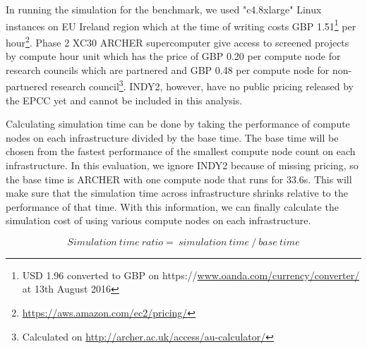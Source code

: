 In running the simulation for the benchmark, we used "c4.8xlarge" Linux instances on EU Ireland region which at the time of writing costs GBP 1.51\footnote{USD 1.96 converted to GBP on https://\url{www.oanda.com/currency/converter/} at 13th August 2016} per hour\footnote{\url{https://aws.amazon.com/ec2/pricing/}}. Phase 2 XC30 ARCHER supercomputer give access to screened projects by compute hour unit which has the price of GBP 0.20 per compute node for research councils which are partnered and GBP 0.48 per compute node for non-partnered research council\footnote{Calculated on \url{http://archer.ac.uk/access/au-calculator/}}. INDY2, however, have no public pricing released by the EPCC yet and cannot be included in this analysis. 


Calculating simulation time can be done by taking the performance of compute nodes on each infrastructure divided by the base time. The base time will be chosen from the fastest performance of the smallest compute node count on each infrastructure. In this evaluation, we ignore INDY2 because of missing pricing, so the base time is ARCHER with one compute node that runs for 33.6s. This will make sure that the simulation time across infrastructure shrinks relative to the performance of that time. With this information, we can finally calculate the simulation cost of using various compute nodes on each infrastructure.

\begin{displaymath}
 Simulation\ time\ ratio=\ simulation\ time\ /\ base\ time
\end{displaymath}

